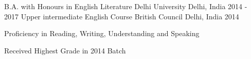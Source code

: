 

\begin{cventries}

  \cventry
    {B.A. with Honours in English Literature} %
    {Delhi University} %
    {Delhi, India} %
    {2014 - 2017} %
    {
    }
  \cventry
    {Upper intermediate English Course}
    {British Council}
    {Delhi, India}
    {2014}
    {
      \begin{cvitems}
        \item {Proficiency in Reading, Writing, Understanding and Speaking}
        \item {Received Highest Grade in 2014 Batch}
      \end{cvitems}
    }
\end{cventries}
